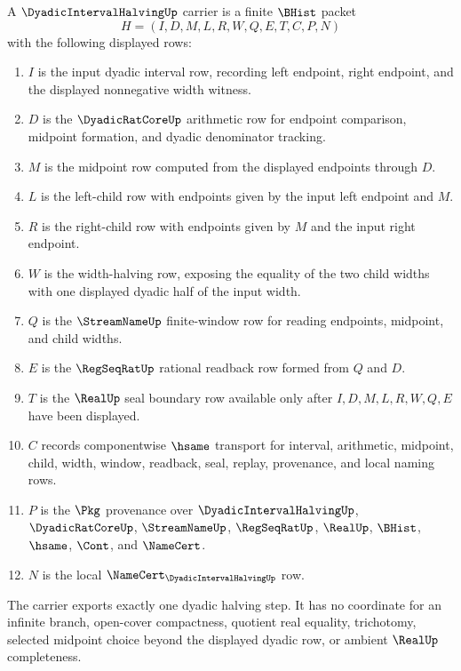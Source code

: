 \begin{definition}
\label{def:dyadic-interval-halving-carrier}
A $\DyadicIntervalHalvingUp$ carrier is a finite $\BHist$ packet
$$
H=(I,D,M,L,R,W,Q,E,T,C,P,N)
$$
with the following displayed rows:
\begin{enumerate}
\item $I$ is the input dyadic interval row, recording left endpoint, right endpoint, and the displayed nonnegative width witness.
\item $D$ is the $\DyadicRatCoreUp$ arithmetic row for endpoint comparison, midpoint formation, and dyadic denominator tracking.
\item $M$ is the midpoint row computed from the displayed endpoints through $D$.
\item $L$ is the left-child row with endpoints given by the input left endpoint and $M$.
\item $R$ is the right-child row with endpoints given by $M$ and the input right endpoint.
\item $W$ is the width-halving row, exposing the equality of the two child widths with one displayed dyadic half of the input width.
\item $Q$ is the $\StreamNameUp$ finite-window row for reading endpoints, midpoint, and child widths.
\item $E$ is the $\RegSeqRatUp$ rational readback row formed from $Q$ and $D$.
\item $T$ is the $\RealUp$ seal boundary row available only after $I,D,M,L,R,W,Q,E$ have been displayed.
\item $C$ records componentwise $\hsame$ transport for interval, arithmetic, midpoint, child, width, window, readback, seal, replay, provenance, and local naming rows.
\item $P$ is the $\Pkg$ provenance over $\DyadicIntervalHalvingUp$, $\DyadicRatCoreUp$, $\StreamNameUp$, $\RegSeqRatUp$, $\RealUp$, $\BHist$, $\hsame$, $\Cont$, and $\NameCert$.
\item $N$ is the local $\NameCert_{\DyadicIntervalHalvingUp}$ row.
\end{enumerate}
The carrier exports exactly one dyadic halving step. It has no coordinate for an infinite branch, open-cover compactness, quotient real equality, trichotomy, selected midpoint choice beyond the displayed dyadic row, or ambient $\RealUp$ completeness.
\end{definition}

